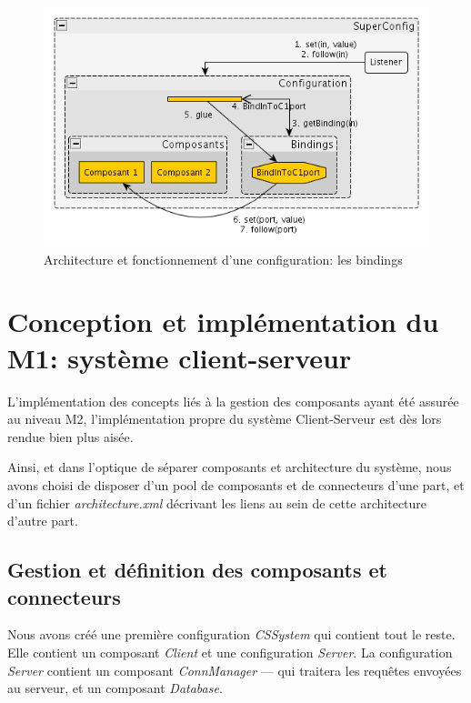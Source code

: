 \documentclass[french,a4paper,titlepage]{article}
\begin{document}
			\begin{figure}[ht]
				\centering
				\includegraphics[width=1.00\textwidth]{obsimpl2.png}
				\caption{Architecture et fonctionnement d'une configuration: les
          			  bindings}
				\label{fig:obsimpl2}
			\end{figure}
			
			
	\section{Conception et implémentation du M1: système
	client-serveur}\label{s:m1}
	
	  L'implémentation des concepts liés à la gestion des composants ayant été
	  assurée au niveau M2, l'implémentation propre du système Client-Serveur est
	  dès lors rendue bien plus aisée.
	  
    Ainsi, et dans l'optique de séparer composants et architecture du système,
    nous avons choisi de disposer d'un pool de composants et de connecteurs
    d'une part, et d'un fichier \emph{architecture.xml} décrivant les liens au
    sein de cette architecture d'autre part.
    
    \subsection{Gestion et définition des composants et connecteurs}

    	Nous avons créé une première configuration \emph{CSSystem} qui contient
    	tout le reste. Elle contient un composant \emph{Client} et une
    	configuration \emph{Server}. La configuration \emph{Server} contient un
    	composant \emph{ConnManager} --- qui traitera les requêtes envoyées au
    	serveur, et un composant \emph{Database}.
    	
\end{document}
